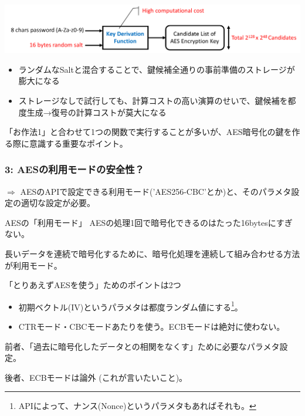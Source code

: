 \documentclass[12pt,dvipdfmx]{beamer}
\begin{document}
\begin{frame}

\begin{center}
\includegraphics[width=\linewidth]{Figs/kdf_strong.pdf}
\end{center}

\begin{itemize}
 \item ランダムなSaltと混合することで、\alert{鍵候補全通りの事前準備のストレージが膨大になる}
 \item ストレージなしで試行しても、計算コストの高い演算のせいで、\alert{鍵候補を都度生成→復号の計算コストが莫大になる}
\end{itemize}

\vspace{2ex}

「お作法1」と合わせて1つの関数で実行することが多いが、AES暗号化の鍵を作る際に意識する重要なポイント。

\end{frame}


\begin{frame}
\frametitle{3: AESの利用モードの安全性？}

$\Rightarrow$ AESのAPIで設定できる利用モード('AES256-CBC'とか)と、そのパラメタ設定の適切な設定が必要。

\vspace{2ex}

\begin{block}{\small AESの「利用モード」}
AESの処理1回で暗号化できるのはたった16bytesにすぎない。

長いデータを連続で暗号化するために、\alert{暗号化処理を連続して組み合わせる方法}が利用モード。
\end{block}

\end{frame}

\begin{frame}
\begin{block}{「とりあえずAESを使う」ためのポイントは2つ}
\begin{itemize}
\item 初期ベクトル(IV)というパラメタは\alert{都度ランダム値にする}\footnote[frame]{APIによって、ナンス(Nonce)というパラメタもあればそれも。}。
\item CTRモード・CBCモードあたりを使う。\alert{ECBモードは絶対に使わない。}
\end{itemize} 
\end{block}

前者、「過去に暗号化したデータとの相関をなくす」ために必要なパラメタ設定。

後者、\alert{ECBモードは論外} (これが言いたいこと)。
\end{frame}
\end{document}
